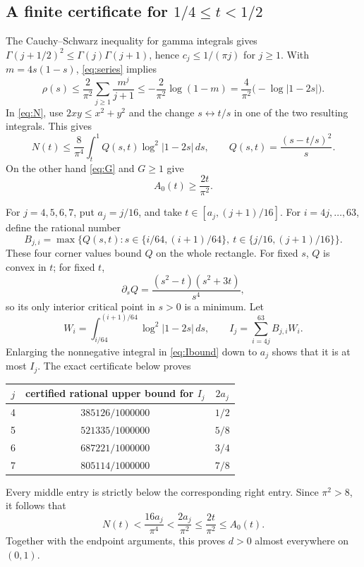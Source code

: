 \documentclass[11pt]{article}
\begin{document}
\subsection*{A finite certificate for $1/4\leq t<1/2$}
The Cauchy--Schwarz inequality for gamma integrals gives
$\Gamma(j+1/2)^2\leq\Gamma(j)\Gamma(j+1)$, hence
$c_j\leq1/(\pi j)$ for $j\geq1$.
With $m=4s(1-s)$, \eqref{eq:series} implies
\begin{equation}\label{eq:logbound}
 \rho(s)\leq\frac2{\pi^2}\sum_{j\geq1}\frac{m^j}{j+1}
 \leq-\frac2{\pi^2}\log(1-m)
 =\frac4{\pi^2}\bigl(-\log|1-2s|\bigr).
\end{equation}
In \eqref{eq:N}, use $2xy\leq x^2+y^2$ and the change
$s\leftrightarrow t/s$ in one of the two resulting integrals. This gives
\begin{equation}\label{eq:Ibound}
 N(t)\leq\frac8{\pi^4}\int_t^1 Q(s,t)\log^2|1-2s|\,ds,
 \qquad Q(s,t)=\frac{(s-t/s)^2}{s}.
\end{equation}
On the other hand \eqref{eq:G} and $G\geq1$ give
\begin{equation}\label{eq:Alower}
 A_0(t)\geq\frac{2t}{\pi^2}.
\end{equation}

For $j=4,5,6,7$, put $a_j=j/16$, and take
$t\in[a_j,(j+1)/16]$. For $i=4j,\ldots,63$, define the rational number
\[
 B_{j,i}=\max\{Q(s,t):s\in\{i/64,(i+1)/64\},\
                         t\in\{j/16,(j+1)/16\}\}.
\]
These four corner values bound $Q$ on the whole rectangle.
For fixed $s$, $Q$ is convex in $t$; for fixed $t$,
\[
 \partial_sQ=\frac{(s^2-t)(s^2+3t)}{s^4},
\]
so its only interior critical point in $s>0$ is a minimum.
Let
\[
 W_i=\int_{i/64}^{(i+1)/64}\log^2|1-2s|\,ds,\qquad
 I_j=\sum_{i=4j}^{63}B_{j,i}W_i.
\]
Enlarging the nonnegative integral in \eqref{eq:Ibound} down to $a_j$
shows that it is at most $I_j$. The exact certificate below proves
\begin{center}
\begin{tabular}{c|c|c}
 $j$ & certified rational upper bound for $I_j$ & $2a_j$\\\hline
 4 & $385126/1000000$ & $1/2$\\
 5 & $521335/1000000$ & $5/8$\\
 6 & $687221/1000000$ & $3/4$\\
 7 & $805114/1000000$ & $7/8$
\end{tabular}
\end{center}
Every middle entry is strictly below the corresponding right entry.
Since $\pi^2>8$, it follows that
\[
 N(t)<\frac{16a_j}{\pi^4}<\frac{2a_j}{\pi^2}
       \leq\frac{2t}{\pi^2}\leq A_0(t).
\]
Together with the endpoint arguments, this proves $d>0$ almost
everywhere on $(0,1)$.
\end{document}
